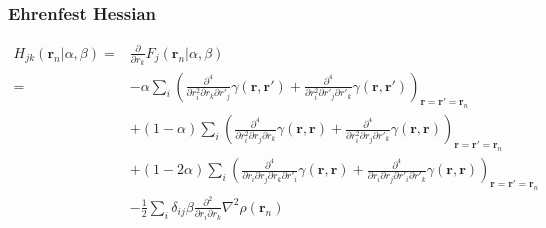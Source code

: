 \documentclass[letterpaper]{article}
\begin{document}
\subsubsection{Ehrenfest Hessian}
\begin{equation}
  \begin{split}
    H_{jk}(\mathbf{r}_n | \alpha, \beta)
    =&
    \frac{\partial}{\partial r_k} F_j(\mathbf{r}_n | \alpha, \beta)\\
    =&
    - \alpha
    \sum_i
    \left(
      \frac{\partial^4}{\partial r^2_i \partial r_k \partial r'_j} \gamma(\mathbf{r}, \mathbf{r}')
      +\frac{\partial^4}{\partial r^2_i \partial r'_j \partial r'_k} \gamma(\mathbf{r}, \mathbf{r}')
    \right)_{\mathbf{r} = \mathbf{r}' = \mathbf{r}_n}\\
    &+ (1 - \alpha)
    \sum_i
    \left(
      \frac{\partial^4}{\partial r^2_i \partial r_j \partial r_k} \gamma(\mathbf{r}, \mathbf{r})
      + \frac{\partial^4}{\partial r^2_i \partial r_j \partial r'_k} \gamma(\mathbf{r}, \mathbf{r})
    \right)_{\mathbf{r} = \mathbf{r}' = \mathbf{r}_n}\\
    &+ (1 - 2\alpha)
    \sum_i
    \left(
      \frac{\partial^4}{\partial r_i \partial r_j \partial r_k \partial r'_i} \gamma(\mathbf{r}, \mathbf{r})
      + \frac{\partial^4}{\partial r_i \partial r_j \partial r'_i \partial r'_k} \gamma(\mathbf{r}, \mathbf{r})
    \right)_{\mathbf{r} = \mathbf{r}' = \mathbf{r}_n}\\
    &- \frac{1}{2} \sum_i \delta_{ij} \beta
    \frac{\partial^2}{\partial r_i \partial r_k} \nabla^2 \rho(\mathbf{r}_n)\\
  \end{split}
\end{equation}
\end{document}
